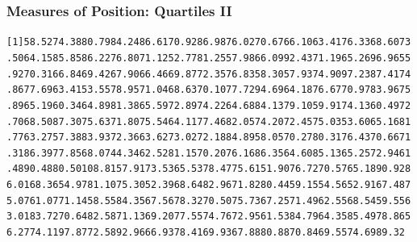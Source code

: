 \documentclass[xcolor=dvipsnames]{beamer}
\begin{document}
\begin{frame}
  \frametitle{Measures of Position: Quartiles II}
\begin{alltt}
\footnotesize
  [1]  58.52  74.38  80.79  84.24  86.61  70.92  86.98  76.02  70.67  66.10  63.41  76.33  68.60  73.50  64.15  85.85  86.22  76.80  71.12  52.77  81.25  57.98  66.09  92.43  71.19  65.26  96.96  55.92  70.31  66.84  69.42  67.90  66.46  69.87  72.35  76.83  58.30  57.93  74.90  97.23  87.41  74.86  77.69  63.41  53.55  78.95  71.04  68.63  70.10  77.72  94.69  64.18  76.67  70.97  83.96  75.89  65.19  60.34  64.89  81.38  65.59  72.89  74.22  64.68  84.13  79.10  59.91  74.13  60.49  72.70  68.50  87.30  75.63  71.80  75.54  64.11  77.46  82.05  74.20  72.45  75.03  53.60  65.16  81.77  63.27  57.38  83.93  72.36  63.62  73.02  72.18  84.89  58.05  70.27  80.31  76.43  70.66  71.31  86.39  77.85  68.07  44.34  62.52  81.15  70.20  76.16  86.35  64.60  85.13  65.25  72.94  61.48  90.48  80.50 108.81  57.91  73.53  65.53  78.47  75.61  51.90  76.72  70.57  65.18  90.92  86.01  68.36  54.97  81.10  75.30  52.39  68.64  82.96  71.82  80.44  59.15  54.56  52.91  67.48  75.07  61.07  71.14  58.55  84.35  67.56  78.32  70.50  75.73  67.25  71.49  62.55  68.54  59.55  63.01  83.72  70.64  82.58  71.13  69.20  77.55  74.76  72.95  61.53  84.79  64.35  85.49  78.86  56.27  74.11  97.87  72.58  92.96  66.93  78.41  69.93  67.88  80.88  70.84  69.55  74.69  89.32
\end{alltt}
\end{frame}
\end{document}

